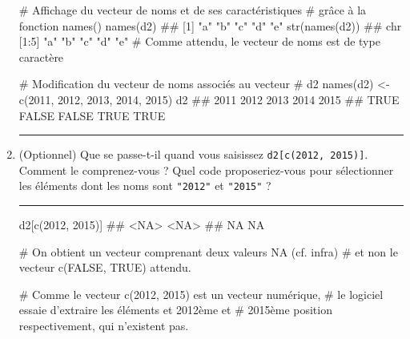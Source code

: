\documentclass[12pt,twosided, notitlepage]{book}
\newenvironment{Shaded}{}{}
\newcommand{\CommentTok}[1]{\textcolor[rgb]{0.00,0.50,0.00}{#1}}
\newcommand{\DecValTok}[1]{#1}
\newcommand{\KeywordTok}[1]{\textcolor[rgb]{0.00,0.00,1.00}{#1}}
\newcommand{\NormalTok}[1]{#1}
\newcommand{\StringTok}[1]{\textcolor[rgb]{0.00,0.50,0.50}{#1}}
\newif \ifsol
\renewenvironment{Shaded}{\begin{snugshade}}{\end{snugshade}}
\begin{document}
\begin{enumerate}
\begin{Shaded}
\begin{Highlighting}[]
\CommentTok{# Affichage du vecteur de noms et de ses caractéristiques}
\CommentTok{# grâce à la fonction names()}
\KeywordTok{names}\NormalTok{(d2)}
\NormalTok{  ## [1] "a" "b" "c" "d" "e"}
\KeywordTok{str}\NormalTok{(}\KeywordTok{names}\NormalTok{(d2))}
\NormalTok{  ##  chr [1:5] "a" "b" "c" "d" "e"}
\CommentTok{# Comme attendu, le vecteur de noms est de type caractère}

\CommentTok{# Modification du vecteur de noms associés au vecteur}
\CommentTok{# d2}
\KeywordTok{names}\NormalTok{(d2) <-}\StringTok{ }\KeywordTok{c}\NormalTok{(}\DecValTok{2011}\NormalTok{, }\DecValTok{2012}\NormalTok{, }\DecValTok{2013}\NormalTok{, }\DecValTok{2014}\NormalTok{, }\DecValTok{2015}\NormalTok{)}
\NormalTok{d2}
\NormalTok{  ##  2011  2012  2013  2014  2015 }
\NormalTok{  ##  TRUE FALSE FALSE  TRUE  TRUE}
\end{Highlighting}
\end{Shaded}

  \begin{center} \rule{0.5\linewidth}{\linethickness}\end{center} 
    \bigskip 
    \fi
\item
  (Optionnel) Que se passe-t-il quand vous saisissez
  \texttt{d2{[}c(2012,\ 2015){]}}\index{\texttt{[}}. Comment le
  comprenez-vous ? Quel code proposeriez-vous pour sélectionner les
  éléments dont les noms sont \texttt{"2012"} et \texttt{"2015"} ?

  \ifsol  \textbf{Indication} Quel est le type du vecteur de noms
  associé à \texttt{d2} ?\fi  \ifsol 

  \begin{center} \rule{0.5\linewidth}{\linethickness}\end{center}

\begin{Shaded}
\begin{Highlighting}[]
\NormalTok{d2[}\KeywordTok{c}\NormalTok{(}\DecValTok{2012}\NormalTok{, }\DecValTok{2015}\NormalTok{)]}
\NormalTok{  ## <NA> <NA> }
\NormalTok{  ##   NA   NA}

\CommentTok{# On obtient un vecteur comprenant deux valeurs NA (cf. infra)}
\CommentTok{# et non le vecteur c(FALSE, TRUE) attendu.}

\CommentTok{# Comme le vecteur c(2012, 2015) est un vecteur numérique, }
\CommentTok{# le logiciel essaie d'extraire les éléments et 2012ème et }
\CommentTok{# 2015ème position respectivement, qui n'existent pas.}


\end{Highlighting}
\end{Shaded}
\end{enumerate}
\end{document}
